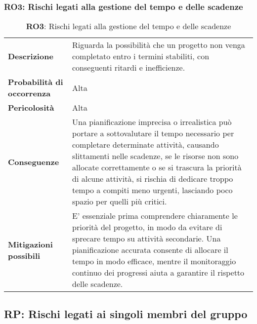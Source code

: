 \subsubsection{RO3: Rischi legati alla gestione del tempo e delle scadenze}
\begin{table}[h!]
    \centering
    \renewcommand{\arraystretch}{1.5} %
    \begin{tabularx}{\textwidth}{|X|X|}\hline
    \rowcolor[HTML]{FFD700} 
    \multicolumn{2}{|c|}{\textbf{Rischi legati alla gestione del tempo e delle scadenze}} \\ \hline
    \textbf{Descrizione} & Riguarda la possibilità che un progetto non venga completato entro i termini stabiliti, con conseguenti ritardi e inefficienze. \\ \hline
    \textbf{Probabilità di occorrenza} & Alta \\ \hline
    \textbf{Pericolosità} & Alta \\ \hline
    \textbf{Conseguenze} & Una pianificazione imprecisa o irrealistica può portare a sottovalutare il tempo necessario per completare determinate attività, causando slittamenti nelle scadenze,
    se le risorse non sono allocate correttamente o se si trascura la priorità di alcune attività, si rischia di dedicare troppo tempo a compiti meno urgenti, lasciando poco spazio per quelli più critici.\\ \hline
    \textbf{Mitigazioni possibili} & E' essenziale prima comprendere chiaramente le priorità del progetto, 
    in modo da evitare di sprecare tempo su attività secondarie. Una pianificazione accurata consente di allocare il tempo in modo efficace, 
    mentre il monitoraggio continuo dei progressi aiuta a garantire il rispetto delle scadenze. \\ \hline
    \end{tabularx}
    \caption{\textbf{RO3}: Rischi legati alla gestione del tempo e delle scadenze}
    \end{table}

\newpage

\subsection{RP: Rischi legati ai singoli membri del gruppo}

